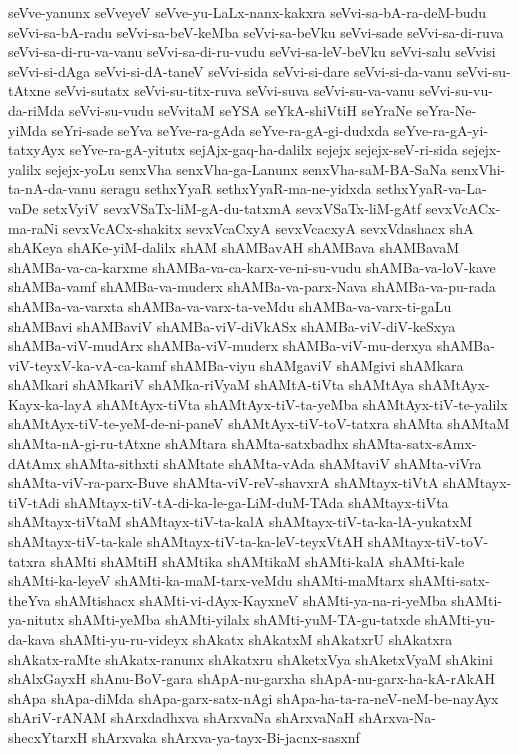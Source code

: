 {seVve-yanunx
seVveyeV
seVve-yu-LaLx-nanx-kakxra
seVvi-sa-bA-ra-deM-budu
seVvi-sa-bA-radu
seVvi-sa-beV-keMba
seVvi-sa-beVku
seVvi-sade
seVvi-sa-di-ruva
seVvi-sa-di-ru-va-vanu
seVvi-sa-di-ru-vudu
seVvi-sa-leV-beVku
seVvi-salu
seVvisi
seVvi-si-dAga
seVvi-si-dA-taneV
seVvi-sida
seVvi-si-dare
seVvi-si-da-vanu
seVvi-su-tAtxne
seVvi-sutatx
seVvi-su-titx-ruva
seVvi-suva
seVvi-su-va-vanu
seVvi-su-vu-da-riMda
seVvi-su-vudu
seVvitaM
seYSA
seYkA-shiVtiH
seYraNe
seYra-Ne-yiMda
seYri-sade
seYva
seYve-ra-gAda
seYve-ra-gA-gi-dudxda
seYve-ra-gA-yi-tatxyAyx
seYve-ra-gA-yitutx
sejAjx-gaq-ha-dalilx
sejejx
sejejx-seV-ri-sida
sejejx-yalilx
sejejx-yoLu
senxVha
senxVha-ga-Lanunx
senxVha-saM-BA-SaNa
senxVhi-ta-nA-da-vanu
seragu
sethxYyaR
sethxYyaR-ma-ne-yidxda
sethxYyaR-va-La-vaDe
setxVyiV
sevxVSaTx-liM-gA-du-tatxmA
sevxVSaTx-liM-gAtf
sevxVcACx-ma-raNi
sevxVcACx-shakitx
sevxVcaCxyA
sevxVcacxyA
sevxVdashacx
shA
shAKeya
shAKe-yiM-dalilx
shAM
shAMBavAH
shAMBava
shAMBavaM
shAMBa-va-ca-karxme
shAMBa-va-ca-karx-ve-ni-su-vudu
shAMBa-va-loV-kave
shAMBa-vamf
shAMBa-va-muderx
shAMBa-va-parx-Nava
shAMBa-va-pu-rada
shAMBa-va-varxta
shAMBa-va-varx-ta-veMdu
shAMBa-va-varx-ti-gaLu
shAMBavi
shAMBaviV
shAMBa-viV-diVkASx
shAMBa-viV-diV-keSxya
shAMBa-viV-mudArx
shAMBa-viV-muderx
shAMBa-viV-mu-derxya
shAMBa-viV-teyxV-ka-vA-ca-kamf
shAMBa-viyu
shAMgaviV
shAMgivi
shAMkara
shAMkari
shAMkariV
shAMka-riVyaM
shAMtA-tiVta
shAMtAya
shAMtAyx-Kayx-ka-layA
shAMtAyx-tiVta
shAMtAyx-tiV-ta-yeMba
shAMtAyx-tiV-te-yalilx
shAMtAyx-tiV-te-yeM-de-ni-paneV
shAMtAyx-tiV-toV-tatxra
shAMta
shAMtaM
shAMta-nA-gi-ru-tAtxne
shAMtara
shAMta-satxbadhx
shAMta-satx-sAmx-dAtAmx
shAMta-sithxti
shAMtate
shAMta-vAda
shAMtaviV
shAMta-viVra
shAMta-viV-ra-parx-Buve
shAMta-viV-reV-shavxrA
shAMtayx-tiVtA
shAMtayx-tiV-tAdi
shAMtayx-tiV-tA-di-ka-le-ga-LiM-duM-TAda
shAMtayx-tiVta
shAMtayx-tiVtaM
shAMtayx-tiV-ta-kalA
shAMtayx-tiV-ta-ka-lA-yukatxM
shAMtayx-tiV-ta-kale
shAMtayx-tiV-ta-ka-leV-teyxVtAH
shAMtayx-tiV-toV-tatxra
shAMti
shAMtiH
shAMtika
shAMtikaM
shAMti-kalA
shAMti-kale
shAMti-ka-leyeV
shAMti-ka-maM-tarx-veMdu
shAMti-maMtarx
shAMti-satx-theYva
shAMtishacx
shAMti-vi-dAyx-KayxneV
shAMti-ya-na-ri-yeMba
shAMti-ya-nitutx
shAMti-yeMba
shAMti-yilalx
shAMti-yuM-TA-gu-tatxde
shAMti-yu-da-kava
shAMti-yu-ru-videyx
shAkatx
shAkatxM
shAkatxrU
shAkatxra
shAkatx-raMte
shAkatx-ranunx
shAkatxru
shAketxVya
shAketxVyaM
shAkini
shAlxGayxH
shAnu-BoV-gara
shApA-nu-garxha
shApA-nu-garx-ha-kA-rAkAH
shApa
shApa-diMda
shApa-garx-satx-nAgi
shApa-ha-ta-ra-neV-neM-be-nayAyx
shAriV-rANAM
shArxdadhxva
shArxvaNa
shArxvaNaH
shArxva-Na-shecxYtarxH
shArxvaka
shArxva-ya-tayx-Bi-jacnx-sasxnf
}
